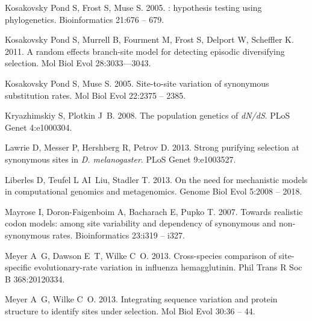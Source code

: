 \documentclass[11pt]{article}
\begin{document}
\begin{thebibliography}{79}
{Kosakovsky Pond} S, Frost S, Muse S. 2005.
: hypothesis testing using phylogenetics.
\newblock Bioinformatics 21:676 -- 679.

{Kosakovsky Pond} S, Murrell B, Fourment M, Frost S, Delport W, Scheffler K.
  2011.
\newblock A random effects branch-site model for detecting episodic
  diversifying selection.
\newblock Mol Biol Evol 28:3033–--3043.

{Kosakovsky Pond} S, Muse S. 2005.
\newblock Site-to-site variation of synonymous substitution rates.
\newblock Mol Biol Evol 22:2375 -- 2385.

Kryazhimskiy S, Plotkin J~B. 2008.
\newblock The population genetics of \emph{dN/dS}.
\newblock PLoS Genet 4:e1000304.

Lawrie D, Messer P, Hershberg R, Petrov D. 2013.
\newblock Strong purifying selection at synonymous sites in \emph{D.
  melanogaster}.
\newblock PLoS Genet 9:e1003527.

Liberles D, Teufel L AI~Liu, Stadler T. 2013.
\newblock On the need for mechanistic models in computational genomics and
  metagenomics.
\newblock Genome Biol Evol 5:2008 -- 2018.

Mayrose I, Doron-Faigenboim A, Bacharach E, Pupko T. 2007.
\newblock Towards realistic codon models: among site variability and dependency
  of synonymous and non-synonymous rates.
\newblock Bioinformatics 23:i319 -- i327.

Meyer A~G, Dawson E~T, Wilke C~O. 2013.
\newblock Cross-species comparison of site-specific evolutionary-rate variation
  in influenza hemagglutinin.
\newblock Phil Trans R Soc B 368:20120334.

Meyer A~G, Wilke C~O. 2013.
\newblock Integrating sequence variation and protein structure to identify
  sites under selection.
\newblock Mol Biol Evol 30:36 -- 44.


\end{thebibliography}
\end{document}
